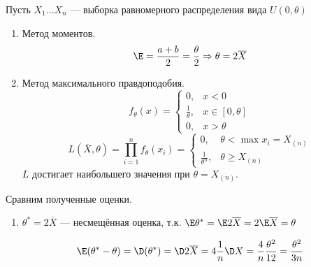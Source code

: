\begin{example}
    Пусть \(X_1 \dots X_n\) --- выборка равномерного распределения вида \(U(0, \theta)\)

    \begin{enumerate}
        \item Метод моментов.
              \[\E = \frac{a + b}{2} = \frac{\theta}{2} \Rightarrow \theta = 2 \overline{X}\]
        \item Метод максимального правдоподобия.
              \[f_\theta(x) = \begin{cases}
                      0,                & x < 0             \\
                      \frac{1}{\theta}, & x \in [0, \theta] \\
                      0,                & x > \theta
                  \end{cases}\]
              \[L(\overline{X}, \theta) = \prod_{i=1}^{n} f_\theta(x_i) = \begin{cases}
                      0,                  & \theta < \max x_i = X_{(n)} \\
                      \frac{1}{\theta^n}, & \theta \geq X_{(n)}
                  \end{cases}\]
              \(L\) достигает наибольшего значения при \(\theta = X_{(n)}\).
    \end{enumerate}

    Сравним полученные оценки.

    \begin{enumerate}
        \item \(\theta^* = 2 \overline{X}\) --- несмещённая оценка, т.к. \(\E \theta^* = \E 2 \overline{X} = 2 \E \overline{X} = \theta\)

              \[\E(\theta^* - \theta) = \D(\theta^*) = \D 2 \overline{X} = 4 \frac{1}{n} \D X = \frac{4}{n} \frac{\theta^2}{12} = \frac{\theta^2}{3n}\]


\end{enumerate}
\end{example}
